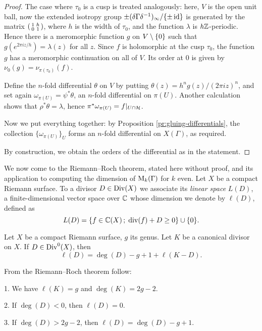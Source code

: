 \begin{proof}
 The case where $\tau_0$ is a cusp is treated analogously: here, $V$ is the open unit ball, now the extended isotropy group $\pm(\delta\Gamma\delta^{-1})_\infty/\{\pm\operatorname{id}\}$ is generated by the matrix $\left(\begin{smallmatrix}1&h\\0&1\end{smallmatrix}\right)$, where $h$ is the width of $\tau_0$, and the function $\lambda$ is $h\mathbb{Z}$-periodic. Hence there is a meromorphic function $g$ on $V\setminus\{0\}$ such that $g(e^{2\pi i z / h})=\lambda(z)$ for all $z$. Since $f$ is holomorphic at the cusp $\tau_0$, the function $g$ has a meromorphic continuation on all of $V$. Its order at $0$ is given by $\nu_0(g)=\nu_{\pi(\tau_0)}(f)$.
 
 Define the $n$-fold differential $\theta$ on $V$ by putting $\theta(z)=h^ng(z)/(2\pi i z)^n$, and set again $\omega_{\pi(U)}=\psi^*\theta$, an $n$-fold differential on $\pi(U)$. Another calculation shows that $\rho^*\theta=\lambda$, hence $\pi^*\omega_{\pi(U)}=f|_{U\cap \mathcal{H}}$.
 
 Now we put everything together: by Proposition \ref{pr:gluing-differentials}, the collection $\{\omega_{\pi(U)}\}_U$ forms an $n$-fold differential on $X(\Gamma)$, as required.
 
 By construction, we obtain the orders of the differential as in the statement.
\end{proof}

We now come to the Riemann–Roch theorem, stated here without proof, and its application to computing the dimension of $\mathrm{M}_k(\Gamma)$ for $k$ even.
Let $X$ be a compact Riemann surface. To a divisor $D\in\operatorname{Div}(X)$ we associate its \emph{linear space} $L(D)$, a finite-dimensional vector space over $\mathbb{C}$ whose dimension we denote by $\ell(D)$, defined as
\[L(D)=\{f\in\mathbb{C}(X)\,;\; \operatorname{div}(f)+D\geq 0\}\cup\{0\}.\]
\begin{thm}
 Let $X$ be a compact Riemann surface, $g$ its genus. Let $K$ be a canonical divisor on $X$. If $D\in\operatorname{Div}^0(X)$, then
 \[\ell(D)=\deg(D)-g+1+\ell(K-D).\]
\end{thm}

\begin{rmk} \label{pr:rrcor} From the Riemann–Roch theorem follow:
 
 1. We have $\ell(K) = g$ and $\deg(K) = 2g-2$.

 2. If $\deg(D)<0$, then $\ell(D)=0$.
 
 3. If $\deg(D)>2g-2$, then $\ell(D)=\deg(D)-g+1$.
\end{rmk}

